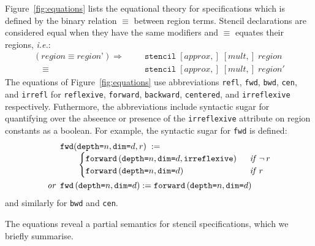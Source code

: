 \documentclass[9pt]{sigplanconf}
\theoremstyle{definition}
\newcommand{\ie}{\emph{i.e.}}
\newcommand{\term}[1]{\texttt{#1}}
\newcommand{\stenFwd}[3]{\term{forward} \, (\term{depth=}#1,
  \term{dim=}#2{#3})}
\newcommand{\irrefl}{\texttt{irreflexive}}
\newcommand{\stenFwdS}[2]{\term{fwd} \, (\term{depth=}#1,
  \term{dim=}#2)}
\newcommand{\irreflS}{\texttt{irrefl}}
\newcommand{\stenFwdSR}[3]{\term{fwd} (\term{depth=}#1,
  \term{dim=}#2, #3)}
\begin{document}
Figure~\ref{fig:equations} lists the equational theory for
specifications which is defined by the binary relation $\equiv$
between region terms. Stencil declarations are considered
equal when they have the same modifiers and $\equiv$ equates
their regions, \ie{}:
\begin{align*}
(\textit{region} \equiv \textit{region'}) 
 \Rightarrow \quad\;\; & \texttt{stencil} \; [\textit{approx},] \; [\textit{mult},] \;
\textit{region} \\[-0.4em]
\quad \equiv \; & \texttt{stencil} \; [\textit{approx},] \;
            [\textit{mult},] \; \textit{region}'
\end{align*}
%
The equations of Figure~\ref{fig:equations} use abbreviations
\term{refl}, \term{fwd}, \term{bwd}, \term{cen}, and \irreflS{}
for \term{reflexive}, \term{forward}, \term{backward},
\term{centered}, and \irrefl{} respectively. Futhermore, the abbreviations include syntactic sugar
for quantifying over the abseence or presence of the \irrefl{}
attribute on region constants as a boolean. For example,
the syntactic sugar for \term{fwd} is defined:
\begin{align*}
\hspace{-0.25em}
& \stenFwdSR{n}{d}{r}
\; := \; \\[-0.4em]
& \qquad \begin{cases}
\stenFwd{n}{d}{, \irrefl} & \;\;\textit{if} \;\, \neg \, r \\
\stenFwd{n}{d}{}  & \;\;\textit{if} \;\,  r
\end{cases} \\
\textit{or} \;\;
& \stenFwdS{n}{d} := \stenFwd{n}{d}{}
\end{align*}
%
and similarly for \term{bwd} and \term{cen}.

The equations reveal a partial semantics for stencil
specifications, which we briefly summarise.
\end{document}
